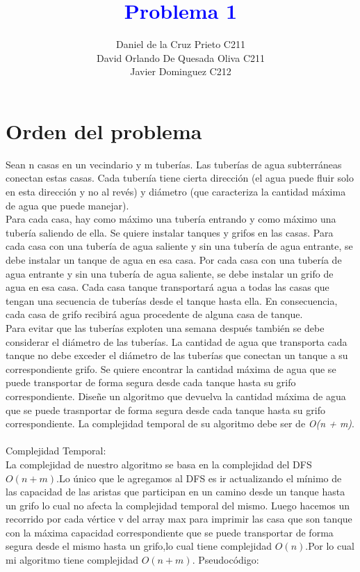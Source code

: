 \documentclass{article}
\begin{document}
    \title{\textcolor{blue}{\textbf{Problema 1 }}\\}
    \author{Daniel de la Cruz Prieto C211\\ David Orlando De Quesada Oliva C211\\Javier Dominguez C212} 
    \date{}
    \maketitle  

    \section*{Orden del problema} 

    Sean n casas en un vecindario y m tuber\'ias. Las tuber\'ias de agua subterr\'aneas conectan estas casas. Cada
    tuberı\'ia tiene cierta direcci\'on (el agua puede fluir solo en esta direcci\'on y no al rev\'es) y di\'ametro (que caracteriza
    la cantidad m\'axima de agua que puede manejar).
    \\[10pt]
    \noindent Para cada casa, hay como m\'aximo una tuber\'ia entrando y como m\'aximo una tuber\'ia saliendo de ella. Se quiere
    instalar tanques y grifos en las casas. Para cada casa con una tuber\'ia de agua saliente y sin una tuber\'ia de agua
    entrante, se debe instalar un tanque de agua en esa casa. Por cada casa con una tuber\'ia de agua entrante y
    sin una tuber\'ia de agua saliente, se debe instalar un grifo de agua en esa casa. Cada casa tanque transportar\'a
    agua a todas las casas que tengan una secuencia de tuber\'ias desde el tanque hasta ella. En consecuencia, cada
    casa de grifo recibir\'a agua procedente de alguna casa de tanque.
    \\[10pt]
    \noindent Para evitar que las tuber\'ias exploten una semana después tambi\'en se debe considerar el di\'ametro de las tuber\'ias.
    La cantidad de agua que transporta cada tanque no debe exceder el di\'ametro de las tuber\'ias que conectan un
    tanque a su correspondiente grifo. Se quiere encontrar la cantidad m\'axima de agua que se puede transportar de
    forma segura desde cada tanque hasta su grifo correspondiente. Dise\~ne un algoritmo que devuelva la cantidad
    m\'axima de agua que se puede trasnportar de forma segura desde cada tanque hasta su grifo correspondiente.
    La complejidad temporal de su algoritmo debe ser de \textit{O(n + m)}.
    \\\\
    Complejidad Temporal:\\
    La complejidad de nuestro algoritmo se basa en la complejidad del DFS $O(n+m)$.Lo \'unico que le agregamos al DFS
    es ir actualizando  el m\'inimo de las capacidad de las aristas que participan en un camino desde un tanque hasta un 
    grifo lo cual no afecta la complejidad temporal del mismo. Luego hacemos un recorrido por cada v\'ertice v del array max
    para imprimir las casa que son tanque con la m\'axima capacidad correspondiente que se puede transportar de forma segura 
    desde el mismo hasta un grifo,lo cual tiene complejidad $O(n)$.Por lo cual mi algoritmo tiene complejidad $O(n+m)$.
    Pseudoc\'odigo:
    
\end{document}
